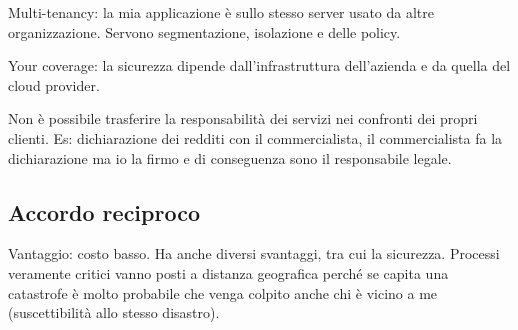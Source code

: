 Multi-tenancy: la mia applicazione è sullo stesso server usato da altre 
organizzazione. Servono segmentazione, isolazione e delle policy.

Your coverage: la sicurezza dipende dall'infrastruttura dell'azienda e da 
quella del cloud provider.

Non è possibile trasferire la responsabilità dei servizi nei confronti dei 
propri clienti. Es: dichiarazione dei redditi con il commercialista, il 
commercialista fa la dichiarazione ma io la firmo e di conseguenza sono il 
responsabile legale.

\subsection{Accordo reciproco}

Vantaggio: costo basso. Ha anche diversi svantaggi, tra cui la sicurezza.
Processi veramente critici vanno posti a distanza geografica perché se capita 
una catastrofe è molto probabile che venga colpito anche chi è vicino a me 
(suscettibilità allo stesso disastro).